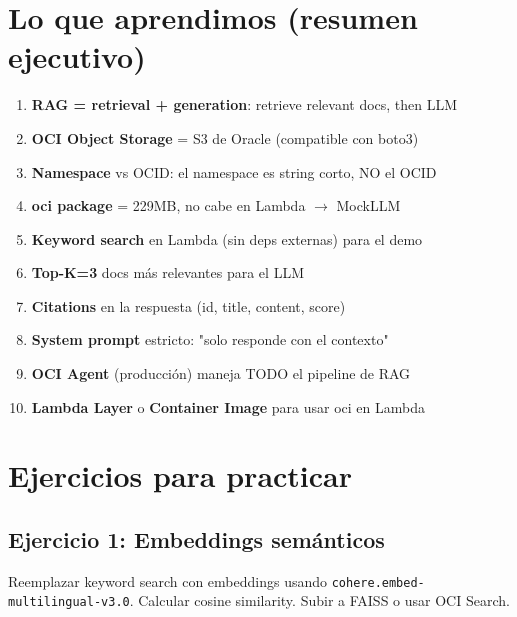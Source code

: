 \documentclass[11pt,a4paper,oneside]{article}
\begin{document}
\section{Lo que aprendimos (resumen ejecutivo)}

\begin{tcolorbox}[colback=okgreen!5!white,colframe=okgreen,title={\textbf{Checklist Fase 5}}]
\begin{enumerate}
  \item \textbf{RAG = retrieval + generation}: retrieve relevant docs, then LLM
  \item \textbf{OCI Object Storage} = S3 de Oracle (compatible con boto3)
  \item \textbf{Namespace} vs OCID: el namespace es string corto, NO el OCID
  \item \textbf{oci package} = 229MB, no cabe en Lambda $\rightarrow$ MockLLM
  \item \textbf{Keyword search} en Lambda (sin deps externas) para el demo
  \item \textbf{Top-K=3} docs m\'as relevantes para el LLM
  \item \textbf{Citations} en la respuesta (id, title, content, score)
  \item \textbf{System prompt} estricto: "solo responde con el contexto"
  \item \textbf{OCI Agent} (producci\'on) maneja TODO el pipeline de RAG
  \item \textbf{Lambda Layer} o \textbf{Container Image} para usar oci en Lambda
\end{enumerate}
\end{tcolorbox}

\section{Ejercicios para practicar}

\subsection{Ejercicio 1: Embeddings sem\'anticos}

Reemplazar keyword search con embeddings usando \texttt{cohere.embed-multilingual-v3.0}. Calcular cosine similarity. Subir a FAISS o usar OCI Search.
\end{document}

